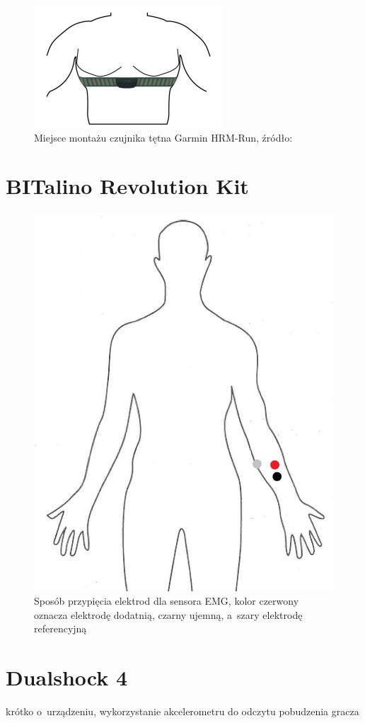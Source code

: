 \begin{figure}
	\centering
	\includegraphics[width=0.5\linewidth]{images/garmin_hrm_placement.png}
	\caption{Miejsce montażu czujnika tętna Garmin HRM-Run, źródło:~\cite{garmin_manual}}
	\label{fig:garmin_placement}
\end{figure}

\section{BITalino Revolution Kit}

\begin{figure}
	\centering
	\includegraphics[height=0.3\textheight]{images/bitalino_placement.jpg}
	\caption{Sposób przypięcia elektrod dla sensora EMG,  kolor czerwony oznacza elektrodę dodatnią, czarny ujemną, a~szary elektrodę referencyjną}
	\label{fig:bitalino_placement}
\end{figure}

\section{Dualshock 4}
krótko o~urządzeniu, wykorzystanie akcelerometru do odczytu pobudzenia gracza
